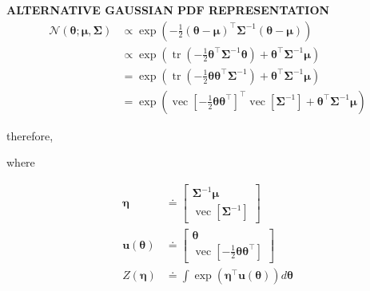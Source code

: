 \begin{whitebox}{\textbf{ALTERNATIVE GAUSSIAN PDF REPRESENTATION}}
    \begin{align*}
        \mathcal{N}(\bm{\theta};\bm{\mu},\bm{\Sigma})&\propto\exp\left(-\frac{1}{2}(\bm{\theta}-\bm{\mu})^{\top}\bm{\Sigma}^{-1}(\bm{\theta}-\bm{\mu})\right)\\
        &\propto\exp\left(\operatorname{tr}\left(-\frac{1}{2} \bm{\theta}^{\top} \bm{\Sigma}^{-1} \bm{\theta}\right)+\bm{\theta}^{\top} \bm{\Sigma}^{-1} \bm{\mu}\right)\\
        &=\exp\left(\operatorname{tr}\left(-\frac{1}{2} \bm{\theta} \bm{\theta}^{\top} \bm{\Sigma}^{-1}\right)+\bm{\theta}^{\top} \bm{\Sigma}^{-1} \bm{\mu}\right)\\
        &=\exp\left(\operatorname{vec}\left[-\frac{1}{2} \bm{\theta} \bm{\theta}^{\top}\right]^{\top} \operatorname{vec}\left[\bm{\Sigma}^{-1}\right]+\bm{\theta}^{\top} \bm{\Sigma}^{-1} \bm{\mu}\right)
    \end{align*}
    \begin{center}
        therefore,
    \end{center}
    \begin{center}
        where
    \end{center}
    \begin{align*}
        \bm{\eta} & \doteq
        \begin{bmatrix}
            \bm{\Sigma}^{-1} \bm{\mu}\\
            \operatorname{vec}\left[\bm{\Sigma}^{-1}\right]
        \end{bmatrix}\\
        \bm{u}(\bm{\theta}) & \doteq
        \begin{bmatrix}
            \bm{\theta}\\
            \operatorname{vec}\left[-\frac{1}{2} \bm{\theta} \bm{\theta}^{\top}\right]
        \end{bmatrix}\\
        Z(\bm{\eta}) & \doteq \int \exp \left(\bm{\eta}^{\top} \bm{u}(\bm{\theta})\right) d \bm{\theta}
    \end{align*}


\end{whitebox}

